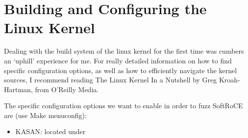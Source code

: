\appendix 
\section{Building and Configuring the Linux Kernel}

Dealing with the build system of the linux kernel for the first time was cumbers an `uphill' experience for me.
For really detailed information on how to find specific configuration options, as well as how
to efficiently navigate the kernel sources, I recommend reading The Linux Kernel In a Nutshell by
Greg Kroah-Hartman, from O'Reilly Media.

The specific configuration options we want to enable in order to fuzz SoftRoCE are (use Make menuconfig):

\begin{itemize}
    \item KASAN: located under
\end{itemize}
